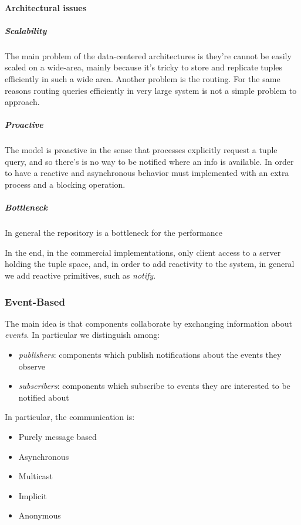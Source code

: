     \paragraph{Architectural issues}
    \subparagraph{Scalability}
    The main problem of the data-centered architectures is they're cannot be easily scaled
    on a wide-area, mainly because it's tricky to store and replicate tuples efficiently in 
    such a wide area. Another problem is the routing. For the same reasons routing queries
    efficiently in very large system is not a simple problem to approach.
    \subparagraph{Proactive}
    The model is proactive in the sense that processes explicitly request a tuple query,
    and so there's is no way to be notified where an info is available. In order to have a
    reactive and asynchronous behavior must implemented with an extra process and a
    blocking operation.
    \subparagraph{Bottleneck}
    In general the repository is a bottleneck for the performance

    In the end, in the commercial implementations, only client access to a server holding the
    tuple space, and, in order to add reactivity to the system, in general we add reactive
    primitives, such as \textit{notify}.

    \subsubsection{Event-Based}
    The main idea is that components collaborate by exchanging information about \textit{events}.
    In particular we distinguish among:
    \begin{itemize}
        \item \textit{publishers}: components which publish notifications about the events they observe
        \item \textit{subscribers}: components which subscribe to events they are interested to be notified about
    \end{itemize}
    In particular, the communication is:
    \begin{itemize}
        \item Purely message based
        \item Asynchronous
        \item Multicast
        \item Implicit
        \item Anonymous
    \end{itemize}

